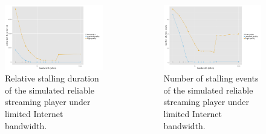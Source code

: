 \documentclass{beamer}
\begin{document}
\begin{frame}
	\begin{columns}
		\begin{figure}
			\includegraphics[width=\columnwidth]{../../chapters/06-mobilestreamingmeasurements/images/R-ltesim-bwseries-stallduration.pdf}
			\caption{Relative stalling duration of the simulated reliable streaming player under limited Internet bandwidth.}
		\end{figure}

		\begin{figure}
			\includegraphics[width=\columnwidth]{../../chapters/06-mobilestreamingmeasurements/images/R-ltesim-bwseries-numstalls.pdf}
			\caption{Number of stalling events of the simulated reliable streaming player under limited Internet bandwidth.}
		\end{figure}
	\end{columns}
\end{frame}
\end{document}
